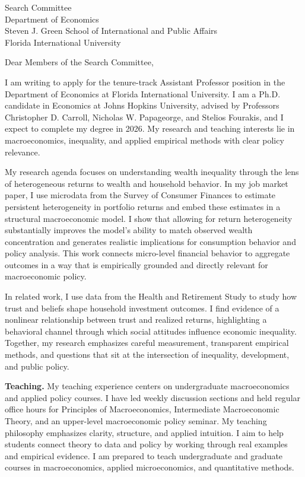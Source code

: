 \documentclass[11pt,letterpaper]{letter}
\begin{document}
\begin{letter}{Search Committee \\
Department of Economics \\
Steven J. Green School of International and Public Affairs \\
Florida International University}

\opening{Dear Members of the Search Committee,}

I am writing to apply for the tenure-track Assistant Professor position in the Department of Economics at Florida International University. I am a Ph.D. candidate in Economics at Johns Hopkins University, advised by Professors Christopher D. Carroll, Nicholas W. Papageorge, and Stelios Fourakis, and I expect to complete my degree in 2026. My research and teaching interests lie in macroeconomics, inequality, and applied empirical methods with clear policy relevance.

My research agenda focuses on understanding wealth inequality through the lens of heterogeneous returns to wealth and household behavior. In my job market paper, I use microdata from the Survey of Consumer Finances to estimate persistent heterogeneity in portfolio returns and embed these estimates in a structural macroeconomic model. I show that allowing for return heterogeneity substantially improves the model’s ability to match observed wealth concentration and generates realistic implications for consumption behavior and policy analysis. This work connects micro-level financial behavior to aggregate outcomes in a way that is empirically grounded and directly relevant for macroeconomic policy.

In related work, I use data from the Health and Retirement Study to study how trust and beliefs shape household investment outcomes. I find evidence of a nonlinear relationship between trust and realized returns, highlighting a behavioral channel through which social attitudes influence economic inequality. Together, my research emphasizes careful measurement, transparent empirical methods, and questions that sit at the intersection of inequality, development, and public policy.

\textbf{Teaching.} My teaching experience centers on undergraduate macroeconomics and applied policy courses. I have led weekly discussion sections and held regular office hours for Principles of Macroeconomics, Intermediate Macroeconomic Theory, and an upper-level macroeconomic policy seminar. My teaching philosophy emphasizes clarity, structure, and applied intuition. I aim to help students connect theory to data and policy by working through real examples and empirical evidence. I am prepared to teach undergraduate and graduate courses in macroeconomics, applied microeconomics, and quantitative methods.


\end{letter}
\end{document}
